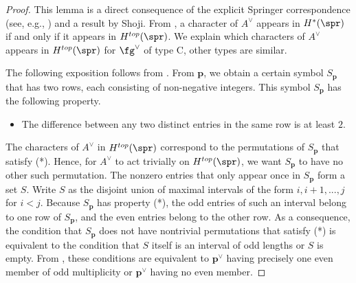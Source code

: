 \documentclass[12pt]{amsart}
\begin{document}
\begin{proof}
    This lemma is a direct consequence of the explicit Springer correspondence (see, e.g., \cite[Section 13.3]{carter1993finite}) and a result by Shoji. From \cite[Theorem 2.5]{Shoji1983}, a character of $A^\vee$ appears in $H^*(\spr)$ if and only if it appears in $H^{top}(\spr)$. We explain which characters of $A^\vee$ appears in $H^{top}(\spr)$ for $\fg^\vee$ of type C, other types are similar. 
    
    The following exposition follows from \cite[Section 13.3]{carter1993finite}. From $\mathbf{p}$, we obtain a certain symbol $S_\mathbf{p}$ that has two rows, each consisting of non-negative integers. This symbol $S_\mathbf{p}$ has the following property.
    \begin{itemize}
        \item[(*)] The difference between any two distinct entries in the same row is at least $2$.
    \end{itemize}
    
    The characters of $A^\vee$ in $H^{top}(\spr)$ correspond to the permutations of $S_\mathbf{p}$ that satisfy (*). Hence, for $A^\vee$ to act trivially on $H^{top}(\spr)$, we want $S_\mathbf{p}$ to have no other such permutation. The nonzero entries that only appear once in $S_\mathbf{p}$ form a set $S$. Write $S$ as the disjoint union of maximal intervals of the form $i,i+1,...,j$ for $i<j$. Because $S_\mathbf{p}$ has property (*), the odd entries of such an interval belong to one row of $S_\mathbf{p}$, and the even entries belong to the other row. As a consequence, the condition that $S_\mathbf{p}$ does not have nontrivial permutations that satisfy (*) is equivalent to the condition that $S$ itself is an interval of odd lengths or $S$ is empty. From \cite[Section 13.3]{carter1993finite}, these conditions are equivalent to $\mathbf{p}^\vee$ having precisely one even member of odd multiplicity or $\mathbf{p}^\vee$ having no even member.
    
   
    
    
    

\end{proof}
\end{document}
